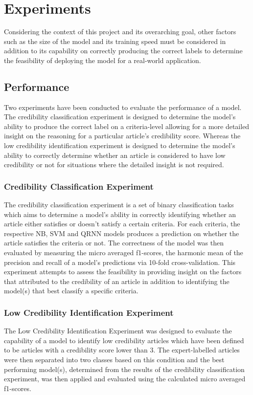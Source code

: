 \documentclass[a4paper,twoside,phd]{BYUPhys}
\begin{document}
\section{Experiments}
\label{sec:Experiments}

Considering the context of this project and its overarching goal, other factors such as the size of the model and its training speed must be considered in addition to its capability on correctly producing the correct labels to determine the feasibility of deploying the model for a real-world application. 

\subsection{Performance}
\label{sec:PerformanceExperiments}

Two experiments have been conducted to evaluate the performance of a model. The credibility classification experiment is designed to determine the model's ability to produce the correct label on a criteria-level allowing for a more detailed insight on the reasoning for a particular article's credibility score. Whereas the low credibility identification experiment is designed to determine the model's ability to correctly determine whether an article is considered to have low credibility or not for situations where the detailed insight is not required.

\subsubsection{Credibility Classification Experiment}
\label{sec:CredibilityClassificationExperiment}
The credibility classification experiment is a set of binary classification tasks which aims to determine a model's ability in correctly identifying whether an article either satisfies or doesn't satisfy a certain criteria. 
For each criteria, the respective NB, SVM and QRNN models produces a prediction on whether the article satisfies the criteria or not. The correctness of the model was then evaluated by measuring the micro averaged f1-scores, the harmonic mean of the precision and recall of a model's predictions via 10-fold cross-validation. This experiment attempts to assess the feasibility in providing insight on the factors that attributed to the credibility of an article in addition to identifying the model(s) that best classify a specific criteria.


\subsubsection{Low Credibility Identification Experiment}
\label{sec:LowCredibilityIdentification}
The Low Credibility Identification Experiment was designed to evaluate the capability of a model to identify low credibility articles which have been defined to be articles with a credibility score lower than 3. The expert-labelled articles were then separated into two  classes based on this condition and the best performing model(s), determined from the results of the credibility classification experiment, was then applied and evaluated using the calculated micro averaged f1-scores. \newline
\end{document}
